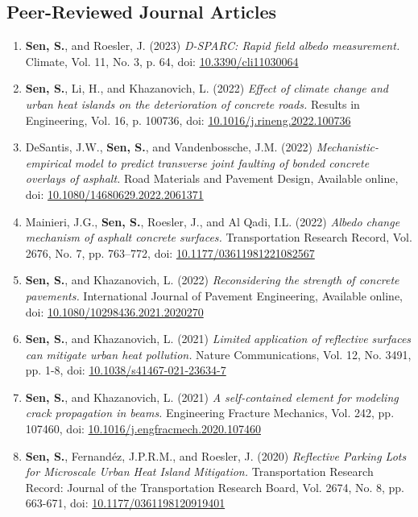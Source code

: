 \documentclass[12pt]{article}
\begin{document}
\subsection*{Peer-Reviewed Journal Articles}
\begin{enumerate}[label=(J\arabic*)]
	\item \textbf{Sen, S.}, and Roesler, J. (2023) \textit{D-SPARC: Rapid field albedo measurement.}  Climate, Vol. 11, No. 3, p. 64, doi: \href{https://doi.org/10.3390/cli11030064}{10.3390/cli11030064}
	\item \textbf{Sen, S.}, Li, H., and Khazanovich, L. (2022) \textit{Effect of climate change and urban heat islands on the deterioration of concrete roads.} Results in Engineering, Vol. 16, p. 100736, doi: \href{https://doi.org/10.1016/j.rineng.2022.100736}{10.1016/j.rineng.2022.100736}
	\item DeSantis, J.W., \textbf{Sen, S.}, and Vandenbossche, J.M. (2022) \textit{Mechanistic-empirical model to predict transverse joint faulting of bonded concrete overlays of asphalt.} Road Materials and Pavement Design, Available online, doi: \href{https://doi.org/10.1080/14680629.2022.2061371}{10.1080/14680629.2022.2061371}
	\item Mainieri, J.G., \textbf{Sen, S.}, Roesler, J., and Al Qadi, I.L. (2022) \textit{Albedo change mechanism of asphalt concrete surfaces.} Transportation Research Record, Vol. 2676, No. 7, pp. 763–772, doi: \href{https://doi.org/10.1177/036119812210825670}{10.1177/03611981221082567}
	\item \textbf{Sen, S.}, and Khazanovich, L. (2022) \textit{Reconsidering the strength of concrete pavements.} International Journal of Pavement Engineering, Available online, doi: \href{https://doi.org/10.1080/10298436.2021.2020270}{10.1080/10298436.2021.2020270}
	\item \textbf{Sen, S.}, and Khazanovich, L. (2021) \textit{Limited application of reflective surfaces can mitigate urban heat pollution.} Nature Communications, Vol. 12, No. 3491, pp. 1-8, doi: \href{https://doi.org/10.1038/s41467-021-23634-7}{10.1038/s41467-021-23634-7}
	\item \textbf{Sen, S.}, and Khazanovich, L. (2021) \textit{A self-contained element for modeling crack propagation in beams.} Engineering Fracture Mechanics, Vol. 242, pp. 107460, doi: \href{https://doi.org/10.1016/j.engfracmech.2020.107460}{10.1016/j.engfracmech.2020.107460}			
	\item \textbf{Sen, S.}, Fernand\'ez, J.P.R.M., and Roesler, J. (2020) \textit{Reflective Parking Lots for Microscale Urban Heat Island Mitigation.}  Transportation Research Record: Journal of the Transportation Research Board, Vol. 2674, No. 8, pp. 663-671, doi: \href{https://doi.org/10.1177/0361198120919401}{10.1177/0361198120919401}	

\end{enumerate}
\end{document}
